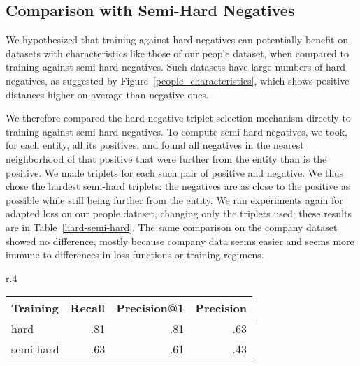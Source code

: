 \subsection{Comparison with Semi-Hard Negatives}
We hypothesized that training against hard negatives can potentially benefit on datasets with characteristics like those of our people dataset, when compared to training against semi-hard negatives.  Such datasets have large numbers of hard negatives, as suggested by Figure~\ref{people_characteristics}, which shows positive distances higher on average than negative ones.  

We therefore compared the hard negative triplet selection mechanism directly to training against semi-hard negatives.  To compute semi-hard negatives, we took, for each entity, all its positives, and found all negatives in the nearest neighborhood of that positive that were further from the entity than is the positive.  We made triplets for each such pair of positive and negative.  We thus chose the hardest semi-hard triplets: the negatives are as close to the positive as possible while still being further from the entity.  We ran experiments again for adapted loss on our people dataset, changing only the triplets used; these results are in Table~\ref{hard-semi-hard}.  The same comparison on the company dataset showed no difference, mostly because company data seems easier and seems more immune to differences in loss functions or training regimens.

\begin{wrapfigure}{r}{.4\textwidth}
\begin{center}
\caption{Precision and Recall for hard and semi-hard training}
\label{hard-semi-hard}
{\scriptsize 
\begin{tabular}{|l|r|r|r|}
\hline 
Training & Recall & Precision@1 & Precision \\
\hline 
hard & .81 & .81 & .63 \\
\hline 
semi-hard & .63 & .61 & .43 \\
\hline 
\end{tabular}}
\end{center}
\end{wrapfigure}

